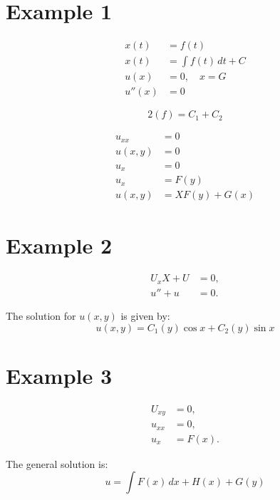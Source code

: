 \documentclass[11pt]{article}
\begin{document}




\section*{Example 1}

\begin{align}
    x(t) &= f(t) \\
    x(t) &= \int f(t) \, dt + C \\
    u(x) &= 0, \quad x = G \\
    u''(x) &= 0
\end{align}

\begin{equation}
    2(f) = C_1 + C_2
\end{equation}

\begin{align}
    u_{xx} &= 0 \\
    u(x, y) &= 0 \\
    u_x &= 0 \\
    u_x &= F(y) \\
    u(x, y) &= X F(y) + G(x)
\end{align}





\section*{Example 2}

\begin{align}
    U_x X + U &= 0, \\
    u'' + u &= 0.
\end{align}

The solution for \( u(x, y) \) is given by:
\[
u(x, y) = C_1(y) \cos x + C_2(y) \sin x
\]

\section*{Example 3}

\begin{align}
    U_{xy} &= 0, \\
    u_{xx} &= 0, \\
    u_x &= F(x).
\end{align}

The general solution is:
\[
u = \int F(x) \, dx + H(x) + G(y)
\]

\end{document}
